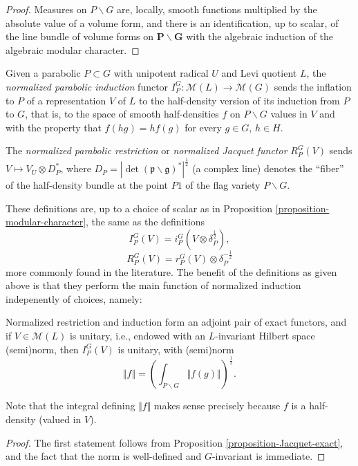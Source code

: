 \begin{proof}
	Measures on $P\backslash G$ are, locally, smooth functions multiplied by the absolute value of a volume form, and there is an identification, up to scalar, of the line bundle of volume forms on $\mathbf P\backslash \mathbf G$ with the algebraic induction of the algebraic modular character. 
\end{proof}

\begin{definition}
	\label{definition-normalized-parabolic-induction-restriction}
	Given a parabolic $P\subset G$ with unipotent radical $U$ and Levi quotient $L$, the {\it normalized parabolic induction} functor $I_P^G:\mathcal M(L)\to \mathcal M(G)$ sends the inflation to $P$ of a representation $V$ of $L$ to the half-density version of its induction from $P$ to $G$, that is, to the space of smooth half-densities $f$ on $P\backslash G$ values in $V$ and with the property that $f(hg) = hf(g)$ for every $g\in G$, $h\in H$. 
	
	The {\it normalized parabolic restriction} or {\it normalized Jacquet functor} $R^G_P(V)$ sends $V\mapsto V_U \otimes D_P^*$, where $D_P = |\det(\mathfrak p\backslash\mathfrak g)^*|^\frac{1}{2}$ (a complex line) denotes the ``fiber'' of the half-density bundle at the point $P1$ of the flag variety $P\backslash G$.
\end{definition}

These definitions are, up to a choice of scalar as in Proposition \ref{proposition-modular-character}, the same as the definitions
$$ I_P^G(V)= i_P^G(V\otimes\delta_P^\frac{1}{2}),$$
$$ R_P^G(V)= r_P^G(V)\otimes\delta_P^{-\frac{1}{2}}$$
more commonly found in the literature. The benefit of the definitions as given above is that they perform the main function of normalized induction indepenently of choices, namely:

\begin{lemma}
	\label{lemma-normalized-induction-unitary}
	Normalized restriction and induction form an adjoint pair of exact functors, and if $V\in \mathcal M(L)$ is unitary, i.e., endowed with an $L$-invariant Hilbert space (semi)norm, then $I_P^G(V)$ is unitary, with (semi)norm
	$$\Vert f\Vert =  \left(\int_{P\backslash G} \Vert f(g)\Vert \right)^\frac{1}{2}.$$
\end{lemma}

Note that the integral defining $\Vert f\Vert$ makes sense precisely because $f$ is a half-density (valued in $V$).

\begin{proof}
	The first statement follows from Proposition \ref{proposition-Jacquet-exact}, and the fact that the norm is well-defined and $G$-invariant is immediate.
\end{proof}


